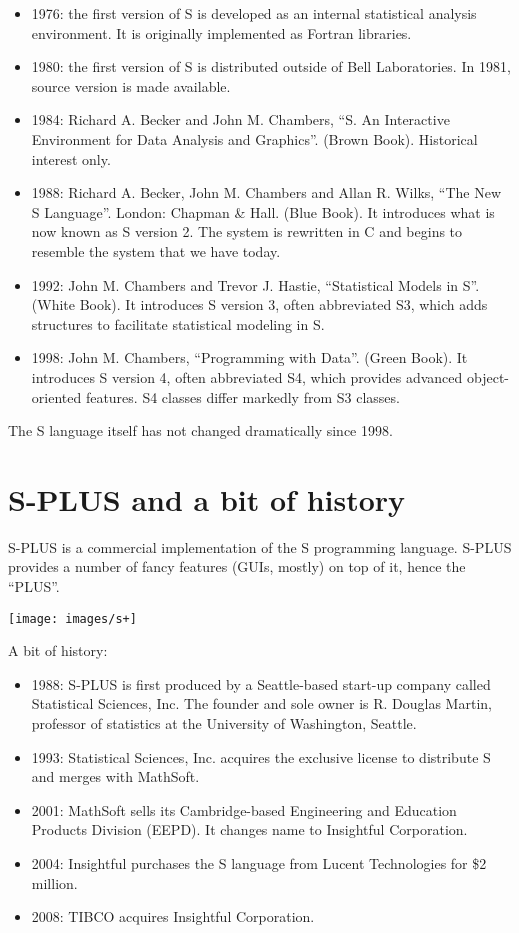 \documentclass[]{book}
\providecommand{\tightlist}{%
  \setlength{\itemsep}{0pt}\setlength{\parskip}{0pt}}
\def\tightlist{}
\begin{document}
\begin{itemize}
\tightlist
\item
  1976: the first version of S is developed as an internal statistical
  analysis environment. It is originally implemented as Fortran
  libraries.
\item
  1980: the first version of S is distributed outside of Bell
  Laboratories. In 1981, source version is made available.
\item
  1984: Richard A. Becker and John M. Chambers, ``S. An Interactive
  Environment for Data Analysis and Graphics''. (Brown Book). Historical
  interest only.
\item
  1988: Richard A. Becker, John M. Chambers and Allan R. Wilks, ``The
  New S Language''. London: Chapman \& Hall. (Blue Book). It introduces
  what is now known as S version 2. The system is rewritten in C and
  begins to resemble the system that we have today.
\item
  1992: John M. Chambers and Trevor J. Hastie, ``Statistical Models in
  S''. (White Book). It introduces S version 3, often abbreviated S3,
  which adds structures to facilitate statistical modeling in S.
\item
  1998: John M. Chambers, ``Programming with Data''. (Green Book). It
  introduces S version 4, often abbreviated S4, which provides advanced
  object-oriented features. S4 classes differ markedly from S3 classes.
\end{itemize}

The S language itself has not changed dramatically since 1998.

\section{S-PLUS and a bit of history}\label{s-plus-and-a-bit-of-history}

S-PLUS is a commercial implementation of the S programming language.
S-PLUS provides a number of fancy features (GUIs, mostly) on top of it,
hence the ``PLUS''.

\begin{center}\texttt{[image: images/s+]} \end{center}

A bit of history:

\begin{itemize}
\tightlist
\item
  1988: S-PLUS is first produced by a Seattle-based start-up company
  called Statistical Sciences, Inc. The founder and sole owner is R.
  Douglas Martin, professor of statistics at the University of
  Washington, Seattle.
\item
  1993: Statistical Sciences, Inc. acquires the exclusive license to
  distribute S and merges with MathSoft.
\item
  2001: MathSoft sells its Cambridge-based Engineering and Education
  Products Division (EEPD). It changes name to Insightful Corporation.
\item
  2004: Insightful purchases the S language from Lucent Technologies for
  \$2 million.
\item
  2008: TIBCO acquires Insightful Corporation.
\end{itemize}
\end{document}
